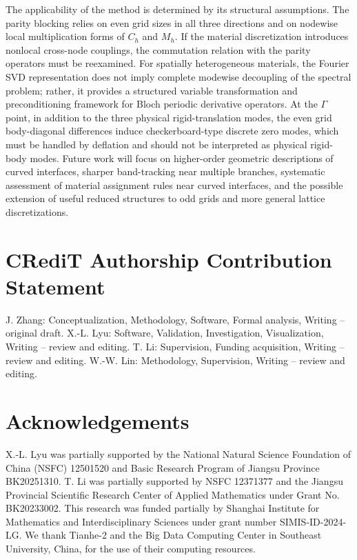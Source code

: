 \documentclass[11pt,oneside]{article}
\numberwithin{equation}{section}
\theoremstyle{plain}
\theoremstyle{remark}
\begin{document}
The applicability of the method is determined by its structural assumptions. The parity blocking relies on even grid sizes in all three directions and on nodewise local multiplication forms of \(C_h\) and \(M_h\). If the material discretization introduces nonlocal cross-node couplings, the commutation relation with the parity operators must be reexamined. For spatially heterogeneous materials, the Fourier SVD representation does not imply complete modewise decoupling of the spectral problem; rather, it provides a structured variable transformation and preconditioning framework for Bloch periodic derivative operators. At the \(\Gamma\) point, in addition to the three physical rigid-translation modes, the even grid body-diagonal differences induce checkerboard-type discrete zero modes, which must be handled by deflation and should not be interpreted as physical rigid-body modes. Future work will focus on higher-order geometric descriptions of curved interfaces, sharper band-tracking near multiple branches, systematic assessment of material assignment rules near curved interfaces, and the possible extension of useful reduced structures to odd grids and more general lattice discretizations.


\section*{CRediT Authorship Contribution Statement}
J. Zhang: Conceptualization, Methodology, Software, Formal analysis, Writing -- original draft. X.-L. Lyu: Software, Validation, Investigation, Visualization, Writing -- review and editing. T. Li: Supervision, Funding acquisition, Writing -- review and editing. W.-W. Lin: Methodology, Supervision, Writing -- review and editing.

\section*{Acknowledgements}
X.-L. Lyu was partially supported by the National Natural Science Foundation of China (NSFC) 12501520 and Basic Research Program of Jiangsu Province BK20251310. T. Li was partially supported by NSFC 12371377 and the Jiangsu Provincial Scientific Research Center of Applied Mathematics under Grant No. BK20233002. This research was funded partially by Shanghai Institute for Mathematics and Interdisciplinary Sciences under grant number SIMIS-ID-2024-LG. We thank Tianhe-2 and the Big Data Computing Center in Southeast University, China, for the use of their computing resources.
\end{document}
